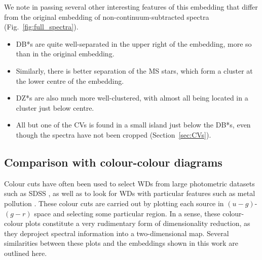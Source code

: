 \documentclass[fleqn,usenatbib]{mnras}
\begin{document}
We note in passing several other interesting features of this embedding that differ from the original embedding of non-continuum-subtracted spectra (Fig.~\ref{fig:full_spectra}).
\begin{itemize}
\item
DB*s are quite well-separated in the upper right of the embedding, more so than in the original embedding.
\item
Similarly, there is better separation of the MS stars, which form a cluster at the lower centre of the embedding.
\item
DZ*s are also much more well-clustered, with almost all being located in a cluster just below centre.
\item
All but one of the CVs is found in a small island just below the DB*s, even though the spectra have not been cropped (Section~\ref{sec:CVs}).
\end{itemize}

\subsection{Comparison with colour-colour diagrams}
\label{sec:colourcolour}

Colour cuts have often been used to select WDs from large photometric datasets such as SDSS \citep{eisenstein06, gentilefusillo15}, as well as to look for WDs with particular features such as metal pollution \citep{hollands15}.
These colour cuts are carried out by plotting each source in $(u-g)$-$(g-r)$ space and selecting some particular region.
In a sense, these colour-colour plots constitute a very rudimentary form of dimensionality reduction, as they deproject spectral information into a two-dimensional map.
Several similarities between these plots and the embeddings shown in this work are outlined here.
\end{document}
